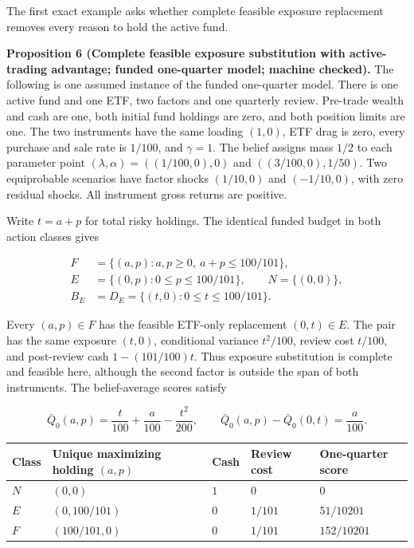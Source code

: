 \documentclass[11pt]{article}
\begin{document}
The first exact example asks whether complete feasible exposure
replacement removes every reason to hold the active fund.

\label{res:Proposition-6}
\textbf{Proposition 6 (Complete feasible exposure substitution with active-trading advantage; funded one-quarter model; machine checked).}
The following is one assumed instance of the funded one-quarter model.
There is one active fund and one ETF, two factors and one quarterly review.
Pre-trade wealth and cash are one, both initial fund holdings are zero, and
both position limits are one. The two instruments have the same loading
\((1,0)\), ETF drag is zero, every purchase and sale rate is \(1/100\), and
\(\gamma=1\). The belief assigns mass \(1/2\) to each parameter point
\((\lambda,\alpha)=((1/100,0),0)\) and
\(((3/100,0),1/50)\). Two equiprobable scenarios have factor shocks
\((1/10,0)\) and \((-1/10,0)\), with zero residual shocks. All instrument
gross returns are positive.

Write \(t=a+p\) for total risky holdings. The identical funded budget in
both action classes gives

\begin{equation*}
\begin{aligned}
F&=\{(a,p):a,p\geq0,\ a+p\leq100/101\},\\
E&=\{(0,p):0\leq p\leq100/101\},\qquad N=\{(0,0)\},\\
B_E&=D_E=\{(t,0):0\leq t\leq100/101\}.
\end{aligned}                                                   \tag{13}\label{eq:13}
\end{equation*}

Every \((a,p)\in F\) has the feasible ETF-only replacement \((0,t)\in E\).
The pair has the same exposure \((t,0)\), conditional variance \(t^2/100\),
review cost \(t/100\), and post-review cash \(1-(101/100)t\). Thus exposure
substitution is complete and feasible here, although the second factor is
outside the span of both instruments. The belief-average scores satisfy

\begin{equation*}
\bar Q_0(a,p)=\frac{t}{100}+\frac{a}{100}-\frac{t^2}{200},
\qquad
\bar Q_0(a,p)-\bar Q_0(0,t)=\frac{a}{100}.              \tag{14}\label{eq:14}
\end{equation*}

{\small
\begin{longtable}{lllll}
\toprule
\textbf{Class} & \textbf{Unique maximizing holding \((a,p)\)} & \textbf{Cash} & \textbf{Review cost} & \textbf{One-quarter score} \\
\midrule
\endhead
\bottomrule
\endlastfoot
\(N\) & \((0,0)\) & \(1\) & \(0\) & \(0\) \\
\(E\) & \((0,100/101)\) & \(0\) & \(1/101\) & \(51/10201\) \\
\(F\) & \((100/101,0)\) & \(0\) & \(1/101\) & \(152/10201\) \\
\end{longtable}}
\end{document}
